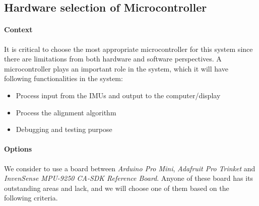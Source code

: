 


\subsection{Hardware selection of Microcontroller}
\paragraph{Context}
It is critical to choose the most appropriate microcontroller for this system since there are limitations from both hardware and software perspectives. A microcontroller plays an important role in the system, which it will have following functionalities in the system:

\begin{itemize}
	\item Process input from the IMUs and output to the computer/display
	\item Process the alignment algorithm
	\item Debugging and testing purpose\\
\end{itemize}

\paragraph{Options}
We consider to use a board between \textit{Arduino Pro Mini}\cite{arduino}, \textit{Adafruit Pro Trinket}\cite{trinket} and \textit{InvenSense MPU-9250 CA-SDK Reference Board}\cite{MPU9250SDK}. Anyone of these board has its outstanding areas and lack, and we will choose one of them based on the following criteria.\\

